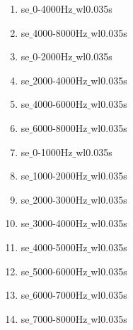 \documentclass[12pt]{article}
\begin{document}
\begin{enumerate}
    \item se$\_$0-4000Hz$\_$wl0.035s \\

    \item se$\_$4000-8000Hz$\_$wl0.035s \\

    \item se$\_$0-2000Hz$\_$wl0.035s \\

    \item se$\_$2000-4000Hz$\_$wl0.035s \\

    \item se$\_$4000-6000Hz$\_$wl0.035s \\

    \item se$\_$6000-8000Hz$\_$wl0.035s \\

    \item se$\_$0-1000Hz$\_$wl0.035s \\

    \item se$\_$1000-2000Hz$\_$wl0.035s \\

    \item se$\_$2000-3000Hz$\_$wl0.035s \\

    \item se$\_$3000-4000Hz$\_$wl0.035s \\

    \item se$\_$4000-5000Hz$\_$wl0.035s \\

    \item se$\_$5000-6000Hz$\_$wl0.035s \\

    \item se$\_$6000-7000Hz$\_$wl0.035s \\

    \item se$\_$7000-8000Hz$\_$wl0.035s \\
\end{enumerate}
\end{document}
